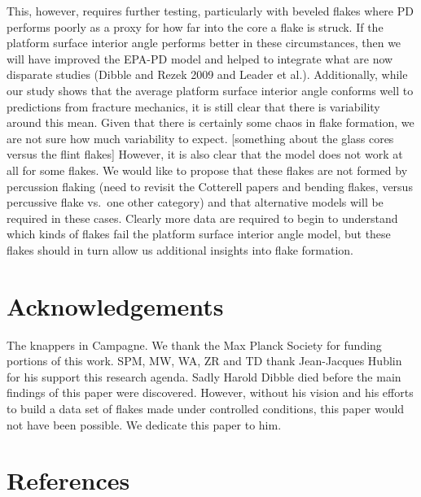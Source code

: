 \documentclass[10pt,letterpaper]{article}
\begin{document}
This, however, requires further testing, particularly with beveled
flakes where PD performs poorly as a proxy for how far into the core a
flake is struck. If the platform surface interior angle performs better
in these circumstances, then we will have improved the EPA-PD model and
helped to integrate what are now disparate studies (Dibble and Rezek
2009 and Leader et al.). Additionally, while our study shows that the
average platform surface interior angle conforms well to predictions
from fracture mechanics, it is still clear that there is variability
around this mean. Given that there is certainly some chaos in flake
formation, we are not sure how much variability to expect. {[}something
about the glass cores versus the flint flakes{]} However, it is also
clear that the model does not work at all for some flakes. We would like
to propose that these flakes are not formed by percussion flaking (need
to revisit the Cotterell papers and bending flakes, versus percussive
flake vs.~one other category) and that alternative models will be
required in these cases. Clearly more data are required to begin to
understand which kinds of flakes fail the platform surface interior
angle model, but these flakes should in turn allow us additional
insights into flake formation.

\hypertarget{acknowledgements}{%
\section{Acknowledgements}\label{acknowledgements}}

The knappers in Campagne. We thank the Max Planck Society for funding
portions of this work. SPM, MW, WA, ZR and TD thank Jean-Jacques Hublin
for his support this research agenda. Sadly Harold Dibble died before
the main findings of this paper were discovered. However, without his
vision and his efforts to build a data set of flakes made under
controlled conditions, this paper would not have been possible. We
dedicate this paper to him.

\hypertarget{references}{%
\section{References}\label{references}}

\nolinenumbers
\end{document}
